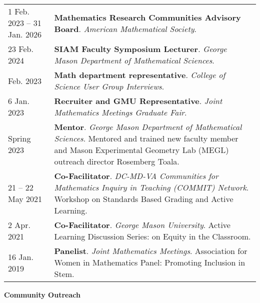     \begin{center}
    {
    \renewcommand{\arraystretch}{1.2}
    \begin{longtable}{p{}  p{}}
    1 Feb.  2023 -- 31 Jan.  2026 & \textbf{Mathematics Research Communities Advisory Board}. \textit{American Mathematical Society}.  \\ 
23 Feb.  2024 & \textbf{SIAM Faculty Symposium Lecturer}. \textit{George Mason Department of Mathematical Sciences}.  \\ 
 Feb.  2023 & \textbf{Math department representative}. \textit{College of Science User Group Interviews}.  \\ 
6 Jan.  2023 & \textbf{Recruiter and GMU Representative}. \textit{Joint Mathematics Meetings Graduate Fair}.  \\ 
  Spring 2023 & \textbf{Mentor}. \textit{George Mason Department of Mathematical Sciences}.  Mentored and trained new faculty member and Mason Experimental Geometry Lab (MEGL) outreach director Rosemberg Toala.  \\ 
21  -- 22 May  2021 & \textbf{Co-Facilitator}. \textit{DC-MD-VA Communities for Mathematics Inquiry in Teaching (COMMIT) Network}.  Workshop on Standards Based Grading and Active Learning.  \\ 
2 Apr.  2021 & \textbf{Co-Facilitator}. \textit{George Mason University}.  Active Learning Discussion Series: on Equity in the Classroom.  \\ 
16 Jan.  2019 & \textbf{Panelist}. \textit{Joint Mathematics Meetings}.  Association for Women in Mathematics Panel: Promoting Inclusion in Stem.  
    \end{longtable}
    } 
    \end{center}

    \vspace{-1em}
    

    \textbf{\large Community Outreach}
    
